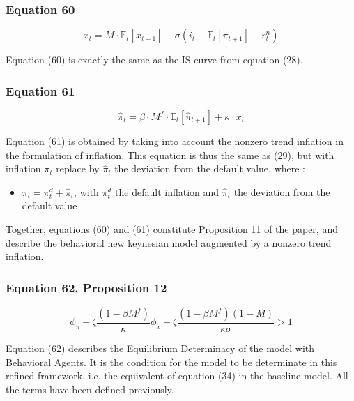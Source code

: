 \documentclass{article}
\begin{document}
\subsubsection*{Equation 60}

\begin{equation}\tag{60}
    x_{t}=M\cdot\mathbb{E}_{t}\left[x_{t+1}\right]-\sigma\left(i_{t}-\mathbb{E}_{t}\left[\pi_{t+1}\right]-r^{n}_{t}\right)
\end{equation}

Equation (60) is exactly the same as the IS curve from equation (28).

\subsubsection*{Equation 61}

\begin{equation}\tag{61}
    \hat{\pi}_{t}=\beta\cdot M^{f}\cdot\mathbb{E}_t\left[\hat{\pi}_{t+1}\right]+\kappa\cdot x_{t}
\end{equation}

Equation (61) is obtained by taking into account the nonzero trend inflation in the formulation of inflation. 
This equation is thus the same as (29), but with inflation $\pi_{t}$ replace by $\hat{\pi}_{t}$ the deviation from the default value, where : 
\begin{itemize}
    \item $\pi_{t}=\pi^{d}_{t}+\hat{\pi}_{t}$, with $\pi^{d}_{t}$ the default inflation and $\hat{\pi}_{t}$ the deviation from the default value
\end{itemize}

Together, equations (60) and (61) constitute Proposition 11 of the paper, and describe the behavioral new keynesian model augmented by a nonzero trend inflation.

\subsubsection*{Equation 62, Proposition 12}

\begin{equation}\tag{62}
    \phi_{\pi}+\zeta \frac{(1-\beta M^{f})}{\kappa}\phi_{x}+\zeta\frac{(1-\beta M^{f})(1-M)}{\kappa \sigma}>1
\end{equation}

Equation (62) describes the Equilibrium Determinacy of the model with Behavioral Agents.
It is the condition for the model to be determinate in this refined framework, i.e. the equivalent of equation (34) in the baseline model.
All the terms have been defined previously. 
\end{document}
